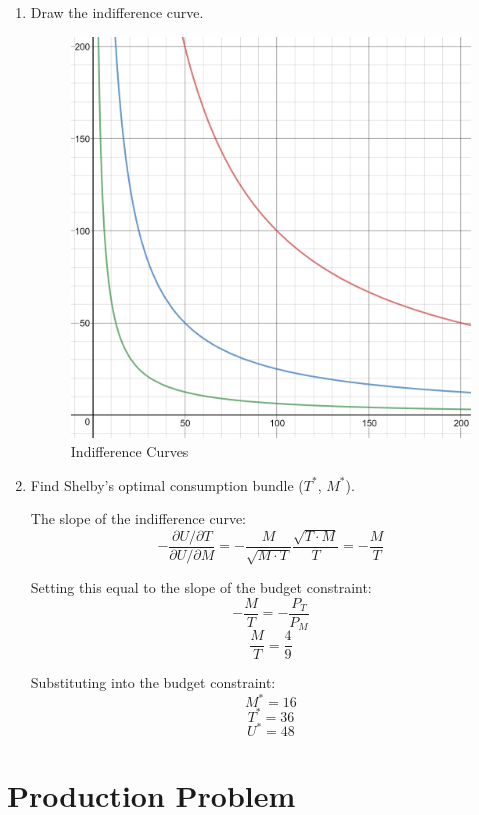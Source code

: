 \documentclass{article}
\begin{document}
\begin{enumerate}[1.]
    \item Draw the indifference curve.

        \begin{figure}[H]
            \centering
            \includegraphics[scale=0.25]{"Indifference Curves"}
            \caption{Indifference Curves}
        \end{figure}

    \item Find Shelby's optimal consumption bundle ($T^{*}$, $M^{*}$).

        The slope of the indifference curve:
        $$ - \frac{ \partial U / \partial T}{ \partial U / \partial M } = - \frac{
        M}{ \sqrt{ M \cdot T } } \frac{ \sqrt{ T \cdot M } }{ T } = - \frac{ M }{
        T}$$

        Setting this equal to the slope of the budget constraint:
        $$ -\frac{ M }{ T } = -\frac{ P_{T} }{ P_{M} } $$
        $$ \frac{ M }{ T } = \frac{ 4 }{ 9 }$$

        Substituting into the budget constraint:
        $$ M^{*} = 16$$
        $$ T^{*} = 36$$
        $$ U^{*} = 48 $$

\end{enumerate}

\section{ Production Problem }
\end{document}
